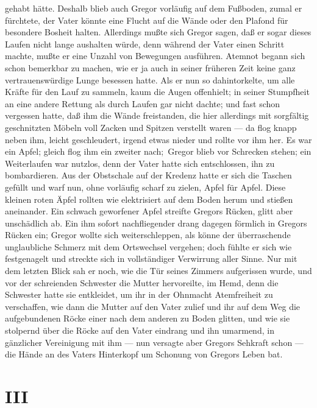 gehabt hätte. Deshalb blieb auch Gregor vorläufig auf dem Fußboden,
zumal er fürchtete, der Vater könnte eine Flucht auf die Wände oder den
Plafond für besondere Bosheit halten. Allerdings mußte sich Gregor
sagen, daß er sogar dieses Laufen nicht lange aushalten würde, denn
während der Vater einen Schritt machte, mußte er eine Unzahl von
Bewegungen ausführen. Atemnot begann sich schon bemerkbar zu machen, wie
er ja auch in seiner früheren Zeit keine ganz vertrauenswürdige Lunge
besessen hatte. Als er nun so dahintorkelte, um alle Kräfte für den Lauf
zu sammeln, kaum die Augen offenhielt; in seiner Stumpfheit an eine
andere Rettung als durch Laufen gar nicht dachte; und fast schon
vergessen hatte, daß ihm die Wände freistanden, die hier allerdings mit
sorgfältig geschnitzten Möbeln voll Zacken und Spitzen verstellt waren
--- da flog knapp neben ihm, leicht geschleudert, irgend etwas nieder und
rollte vor ihm her. Es war ein Apfel; gleich flog ihm ein zweiter nach;\est\
Gregor blieb vor Schrecken stehen; ein Weiterlaufen war nutzlos, denn
der Vater hatte sich entschlossen, ihn zu bombardieren. Aus der
Obstschale auf der Kredenz hatte er sich die Taschen gefüllt und warf
nun, ohne vorläufig scharf zu zielen, Apfel für Apfel. Diese kleinen
roten Äpfel rollten wie elektrisiert auf dem Boden herum und stießen
aneinander. Ein schwach geworfener Apfel streifte Gregors Rücken, glitt
aber unschädlich ab. Ein ihm sofort nachfliegender drang dagegen
förmlich in Gregors Rücken ein; Gregor wollte sich weiterschleppen, als
könne der überraschende unglaubliche Schmerz mit dem Ortswechsel
vergehen; doch fühlte er sich wie festgenagelt und streckte sich in
vollständiger Verwirrung aller Sinne. Nur mit dem letzten Blick sah er
noch, wie die Tür seines Zimmers aufgerissen wurde, und vor der
schreienden Schwester die Mutter hervoreilte, im Hemd, denn die
Schwester hatte sie entkleidet, um ihr in der Ohnmacht Atemfreiheit zu
verschaffen, wie dann die Mutter auf den Vater zulief und ihr auf dem
Weg die aufgebundenen Röcke einer nach dem anderen zu Boden glitten, und
wie sie stolpernd über die Röcke auf den Vater eindrang und ihn
umarmend, in gänzlicher Vereinigung mit ihm --- nun versagte aber Gregors
Sehkraft schon --- die Hände an des Vaters Hinterkopf um Schonung von
Gregors Leben bat.

\pagebreak

\vspace*{2.5cm}

\section{III}

